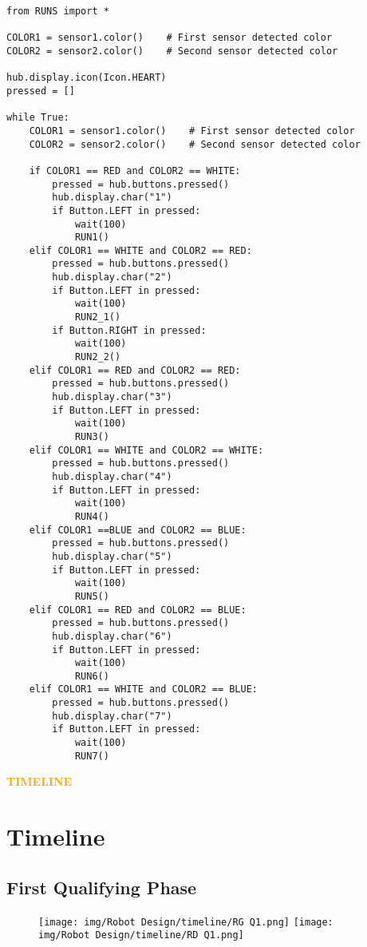 \newpage
\begin{lstlisting}
from RUNS import *

COLOR1 = sensor1.color()    # First sensor detected color
COLOR2 = sensor2.color()    # Second sensor detected color  

hub.display.icon(Icon.HEART)
pressed = []

while True:
    COLOR1 = sensor1.color()    # First sensor detected color
    COLOR2 = sensor2.color()    # Second sensor detected color  

    if COLOR1 == RED and COLOR2 == WHITE:
        pressed = hub.buttons.pressed()
        hub.display.char("1")
        if Button.LEFT in pressed:
            wait(100)
            RUN1()
    elif COLOR1 == WHITE and COLOR2 == RED:
        pressed = hub.buttons.pressed()
        hub.display.char("2")
        if Button.LEFT in pressed:
            wait(100)
            RUN2_1()
        if Button.RIGHT in pressed:
            wait(100)
            RUN2_2()  
    elif COLOR1 == RED and COLOR2 == RED:
        pressed = hub.buttons.pressed()
        hub.display.char("3")
        if Button.LEFT in pressed:
            wait(100)
            RUN3()
    elif COLOR1 == WHITE and COLOR2 == WHITE:
        pressed = hub.buttons.pressed()
        hub.display.char("4")
        if Button.LEFT in pressed:
            wait(100)
            RUN4()
    elif COLOR1 ==BLUE and COLOR2 == BLUE:
        pressed = hub.buttons.pressed()
        hub.display.char("5")
        if Button.LEFT in pressed:
            wait(100)
            RUN5()
    elif COLOR1 == RED and COLOR2 == BLUE:
        pressed = hub.buttons.pressed()
        hub.display.char("6")
        if Button.LEFT in pressed:
            wait(100)
            RUN6()
    elif COLOR1 == WHITE and COLOR2 == BLUE:
        pressed = hub.buttons.pressed()
        hub.display.char("7")
        if Button.LEFT in pressed:
            wait(100)
            RUN7()
\end{lstlisting}
\newpage

\newpage

\begin{center}
    \huge \textbf{\textcolor{orange}{TIMELINE}} \\[0.5cm]
\end{center}
\section{Timeline}
\subsection{First Qualifying Phase}
\vspace{1cm}
\begin{figure}[ht]
    \centering
    \texttt{[image: img/Robot Design/timeline/RG Q1.png]}  
    \texttt{[image: img/Robot Design/timeline/RD Q1.png]}  
    \label{fig: timeline Q1}
\end{figure}


